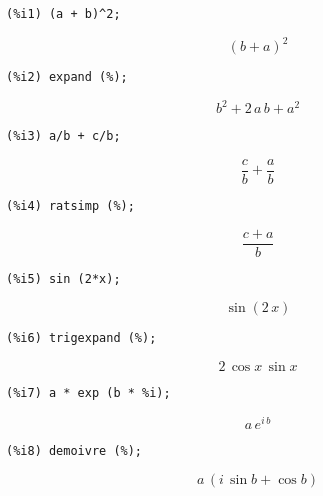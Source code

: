 \documentclass[12pt,leqno]{article}
\begin{document}
\begin{enumerate}
\begin{verbatim}
(%i1) (a + b)^2;
\end{verbatim}
\begin{equation}
\left(b+a\right)^2\tag{\%o1}
\label{eq:doc-group1-code22-1-1}
\end{equation}
\begin{verbatim}
(%i2) expand (%);
\end{verbatim}
\begin{equation}
b^2+2\,a\,b+a^2\tag{\%o2}
\label{eq:doc-group1-code22-2-1}
\end{equation}
\begin{verbatim}
(%i3) a/b + c/b;
\end{verbatim}
\begin{equation}
\frac{c}{b}+\frac{a}{b}\tag{\%o3}
\label{eq:doc-group1-code22-3-1}
\end{equation}
\begin{verbatim}
(%i4) ratsimp (%);
\end{verbatim}
\begin{equation}
\frac{c+a}{b}\tag{\%o4}
\label{eq:doc-group1-code22-4-1}
\end{equation}
\begin{verbatim}
(%i5) sin (2*x);
\end{verbatim}
\begin{equation}
\sin \left(2\,x\right)\tag{\%o5}
\label{eq:doc-group1-code22-5-1}
\end{equation}
\begin{verbatim}
(%i6) trigexpand (%);
\end{verbatim}
\begin{equation}
2\,\cos x\,\sin x\tag{\%o6}
\label{eq:doc-group1-code22-6-1}
\end{equation}
\begin{verbatim}
(%i7) a * exp (b * %i);
\end{verbatim}
\begin{equation}
a\,e^{i\,b}\tag{\%o7}
\label{eq:doc-group1-code22-7-1}
\end{equation}
\begin{verbatim}
(%i8) demoivre (%);
\end{verbatim}
\begin{equation}
a\,\left(i\,\sin b+\cos b\right)\tag{\%o8}
\label{eq:doc-group1-code22-8-1}
\end{equation}


\end{enumerate}
\end{document}
